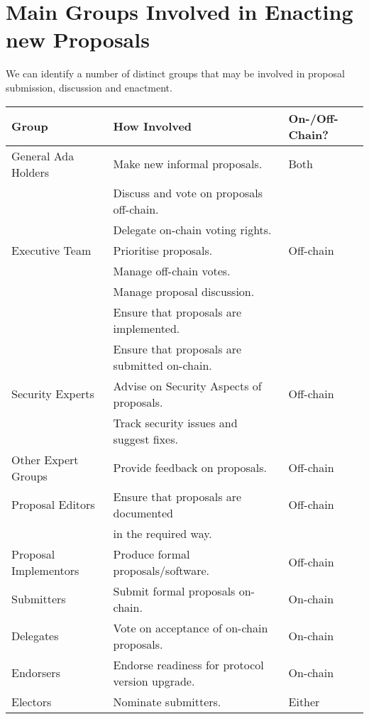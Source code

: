 \pagebreak
\section{Main Groups Involved in Enacting new Proposals}
\label{sect:groups}

We can identify a number of distinct groups that may be involved in proposal submission, discussion and enactment.

\vspace{1em}
\begin{tabular}{||l|l|l||}
  \hline \hline
  \textbf{Group} & \textbf{How Involved} & \textbf{On-/Off-Chain?}\\
  \hline
  General Ada Holders  & Make new informal proposals. & Both \\
                       & Discuss and vote on proposals off-chain. & \\
  			               & Delegate on-chain voting rights. & \\
  \hline
  Executive Team  & Prioritise proposals. & Off-chain \\
                       & Manage off-chain votes. & \\
                       & Manage proposal discussion. & \\
  			               & Ensure that proposals are implemented. & \\
  			               & Ensure that proposals are submitted on-chain. & \\
  \hline
  Security Experts			       & Advise on Security Aspects of proposals. & Off-chain \\
                               & Track security issues and suggest fixes. & \\
  \hline
  Other Expert Groups			       & Provide feedback on proposals. & Off-chain \\
  \hline
  Proposal Editors			   & Ensure that proposals are documented & Off-chain \\
                     & in the required way. &  \\
  \hline
  Proposal Implementors			   & Produce formal proposals/software. & Off-chain\\
  \hline
  Submitters				   & Submit formal proposals on-chain. & On-chain \\
  \hline
  Delegates				   & Vote on acceptance of on-chain proposals. & On-chain \\
  \hline
  Endorsers			   & Endorse readiness for protocol version upgrade. & On-chain\\
  \hline
  Electors			       & Nominate submitters. & Either \\
  \hline \hline
\end{tabular}

